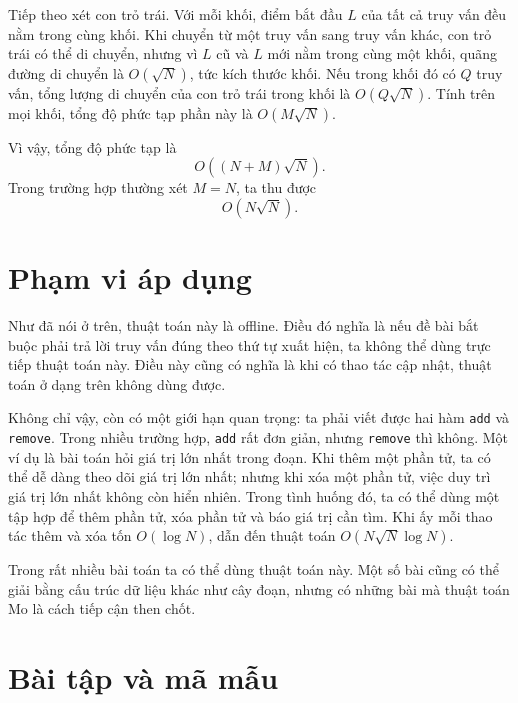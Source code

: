 \documentclass[11pt]{article}
\begin{document}
Tiếp theo xét con trỏ trái. Với mỗi khối, điểm bắt đầu $L$ của tất cả truy vấn
đều nằm trong cùng khối. Khi chuyển từ một truy vấn sang truy vấn khác, con trỏ
trái có thể di chuyển, nhưng vì $L$ cũ và $L$ mới nằm trong cùng một khối, quãng
đường di chuyển là $O(\sqrt N)$, tức kích thước khối. Nếu trong khối đó có
$Q$ truy vấn, tổng lượng di chuyển của con trỏ trái trong khối là
$O(Q\sqrt N)$. Tính trên mọi khối, tổng độ phức tạp phần này là
$O(M\sqrt N)$.

Vì vậy, tổng độ phức tạp là
\[
  O((N+M)\sqrt N).
\]
Trong trường hợp thường xét $M=N$, ta thu được
\[
  O(N\sqrt N).
\]

\section{Phạm vi áp dụng}

Như đã nói ở trên, thuật toán này là offline. Điều đó nghĩa là nếu đề bài bắt
buộc phải trả lời truy vấn đúng theo thứ tự xuất hiện, ta không thể dùng trực
tiếp thuật toán này. Điều này cũng có nghĩa là khi có thao tác cập nhật, thuật
toán ở dạng trên không dùng được.

Không chỉ vậy, còn có một giới hạn quan trọng: ta phải viết được hai hàm
\texttt{add} và \texttt{remove}. Trong nhiều trường hợp, \texttt{add} rất đơn
giản, nhưng \texttt{remove} thì không. Một ví dụ là bài toán hỏi giá trị lớn
nhất trong đoạn. Khi thêm một phần tử, ta có thể dễ dàng theo dõi giá trị lớn
nhất; nhưng khi xóa một phần tử, việc duy trì giá trị lớn nhất không còn hiển
nhiên. Trong tình huống đó, ta có thể dùng một tập hợp để thêm phần tử, xóa
phần tử và báo giá trị cần tìm. Khi ấy mỗi thao tác thêm và xóa tốn
$O(\log N)$, dẫn đến thuật toán $O(N\sqrt N\log N)$.

Trong rất nhiều bài toán ta có thể dùng thuật toán này. Một số bài cũng có thể
giải bằng cấu trúc dữ liệu khác như cây đoạn, nhưng có những bài mà thuật toán
Mo là cách tiếp cận then chốt.

\section{Bài tập và mã mẫu}
\end{document}

